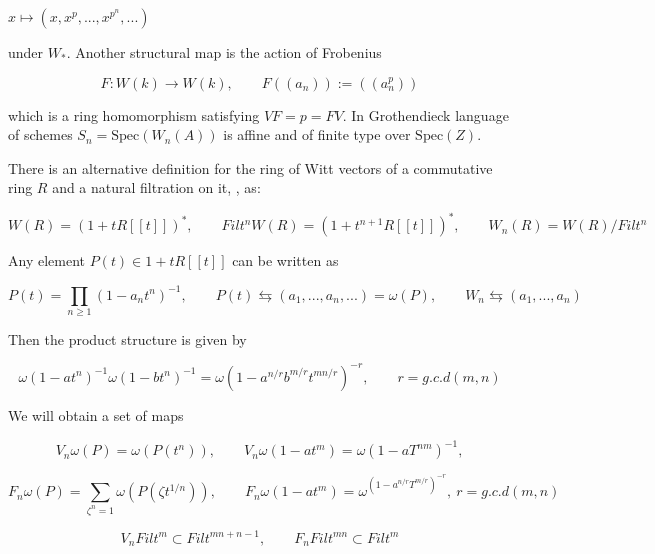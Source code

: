 \documentclass[12pt,twoside]{amsart}
\begin{document}
\begin{center}
$x \mapsto (x,x^p,..., x^{p^n},...)$ 
\end{center}

\vspace{0.5cm}

\noindent
under $W_*$. Another structural map is the action of Frobenius 

\[ F:W(k) \to W(k) , \qquad F((a_n)):=((a_n^p)) \]

\vspace{0.5cm}

\noindent
which is a ring homomorphism satisfying $VF=p=FV$. In Grothendieck language of schemes $S_n=\text{Spec}(W_n(A))$ is affine and of finite type over $\text{Spec}(Z)$. 

\vspace{0.5cm}

\noindent
There is an alternative definition for the ring of Witt vectors of a commutative ring $R$  and a natural filtration on it, \cite{BL}, as:

\[ W(R)=(1+tR[[t]])^* , \qquad Filt^nW(R)=(1+t^{n+1}R[[t]])^* , \qquad W_n(R)=W(R)/Filt^n \]

\vspace{0.5cm}

\noindent
Any element $P(t) \in 1+tR[[t]]$ can be written as 

\[ P(t)=\prod_{n \geq 1}(1-a_nt^n)^{-1} ,\qquad P(t) \leftrightarrows (a_1,...,a_n,...)=\omega(P), \qquad W_n \leftrightarrows (a_1,...,a_n) \]

\vspace{0.5cm}

\noindent
Then the product structure is given by 

\[ \omega(1-at^n)^{-1} \omega(1-bt^n)^{-1} =\omega(1-a^{n/r}b^{m/r}t^{mn/r})^{-r}, \qquad r=g.c.d(m,n) \]

\vspace{0.5cm}

\noindent
We will obtain a set of maps 

\[ V_n\omega(P)=\omega(P(t^n)), \qquad V_n\omega(1-at^m)=\omega(1-aT^{nm})^{-1},\]

\[ F_n\omega(P)=\sum_{\zeta^n=1}\omega(P(\zeta t^{1/n})), \qquad F_n\omega(1-at^m)=\omega^(1-a^{n/r}T^{m/r})^{-r}
, \ r=g.c.d(m,n) \]

\[ V_nFilt^m \subset Filt^{mn+n-1}, \qquad F_n Filt^{mn} \subset Filt^m \]

\vspace{0.5cm}
\end{document}
